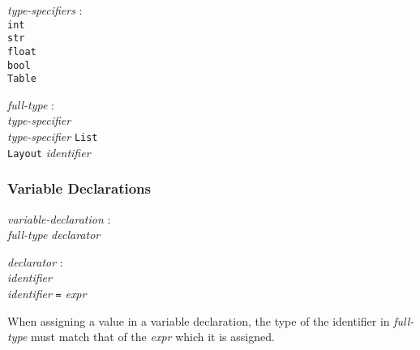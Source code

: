 \documentclass{article}
\begin{document}
\begin{tabbing}
	\= \emph{type}\=\emph{-specifiers} : \\
		\>\> \texttt{int} \\
		\>\> \texttt{str} \\
		\>\> \texttt{float} \\
		\>\> \texttt{bool} \\
		\>\> \texttt{Table} 
\end{tabbing}
\begin{tabbing}
	\= \emph{full}\=\emph{-type} : \\
		\>\> \emph{type-specifier} \\
		\>\> \emph{type-specifier} \texttt{List} \\
		\>\> \texttt{Layout} \emph{identifier} 
\end{tabbing}

\subsubsection{Variable Declarations}
\begin{tabbing}
	\= \emph{vari}\=\emph{able-declaration} : \\
		\> \> \emph{full-type} \emph{declarator} 
\end{tabbing}

\begin{tabbing}
	\= \emph{decl}\=\emph{arator} : \\
		\> \> \emph{identifier} \\
		\> \> \emph{identifier} \texttt{=} \emph{expr} 
\end{tabbing}
When assigning a value in a variable declaration, the type of the identifier in \emph{full-type} must match that of the \emph{expr} which it is assigned.
\end{document}
